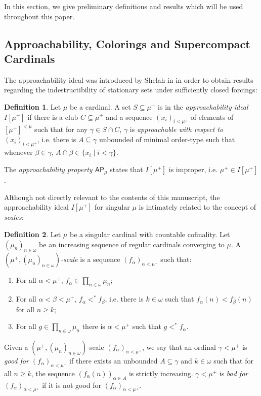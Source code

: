 \documentclass[a4paper]{amsart}
\theoremstyle{definition}
\newtheorem{mydef}{Definition}[section]
\theoremstyle{remark}
\theoremstyle{plain}
\numberwithin{mydef}{section}
\newcommand{\AP}{\mathsf{AP}}
\begin{document}
	In this section, we give preliminary definitions and results which will be used throughout this paper.
	
	\subsection{Approachability, Colorings and Supercompact Cardinals}\hfill
	
	The approachability ideal was introduced by Shelah in \cite{ShelahSuccSingCard} in order to obtain results regarding the indestructibility of stationary sets under sufficiently closed forcings:
	
	\begin{mydef}
		Let $\mu$ be a cardinal. A set $S\subseteq\mu^+$ is in the \emph{approachability ideal} $I[\mu^+]$ if there is a club $C\subseteq\mu^+$ and a sequence $(x_i)_{i<\mu^+}$ of elements of $[\mu^+]^{<\mu}$ such that for any $\gamma\in S\cap C$, $\gamma$ is \emph{approachable with respect to $(x_i)_{i<\mu^+}$}, i.e. there is $A\subseteq\gamma$ unbounded of minimal order-type such that whenever $\beta\in\gamma$, $A\cap\beta\in\{x_i\;|\;i<\gamma\}$.
		
		The \emph{approachability property $\AP_{\mu}$} states that $I[\mu^+]$ is improper, i.e. $\mu^+\in I[\mu^+]$.
	\end{mydef}
	
	Although not directly relevant to the contents of this manuscript, the approachability ideal $I[\mu^+]$ for singular $\mu$ is intimately related to the concept of \emph{scales}:
	
	\begin{mydef}
		Let $\mu$ be a singular cardinal with countable cofinality. Let $(\mu_n)_{n\in\omega}$ be an increasing sequence of regular cardinals converging to $\mu$. A \emph{$(\mu^+,(\mu_n)_{n\in\omega})$-scale} is a sequence $(f_{\alpha})_{\alpha<\mu^+}$ such that:
		\begin{enumerate}
			\item For all $\alpha<\mu^+$, $f_{\alpha}\in\prod_{n\in\omega}\mu_n$;
			\item For all $\alpha<\beta<\mu^+$, $f_{\alpha}<^*f_{\beta}$, i.e. there is $k\in\omega$ such that $f_{\alpha}(n)<f_{\beta}(n)$ for all $n\geq k$;
			\item For all $g\in\prod_{n\in\omega}\mu_n$ there is $\alpha<\mu^+$ such that $g<^*f_{\alpha}$.
		\end{enumerate}
		
		Given a $(\mu^+,(\mu_n)_{n\in\omega})$-scale $(f_{\alpha})_{\alpha<\mu^+}$, we say that an ordinal $\gamma<\mu^+$ is \emph{good for $(f_{\alpha})_{\alpha<\mu^+}$} if there exists an unbounded $A\subseteq\gamma$ and $k\in\omega$ such that for all $n\geq k$, the sequence $(f_{\alpha}(n))_{\alpha\in A}$ is strictly increasing. $\gamma<\mu^+$ is \emph{bad for $(f_{\alpha})_{\alpha<\mu^+}$} if it is not good for $(f_{\alpha})_{\alpha<\mu^+}$.
	\end{mydef}
	
\end{document}
